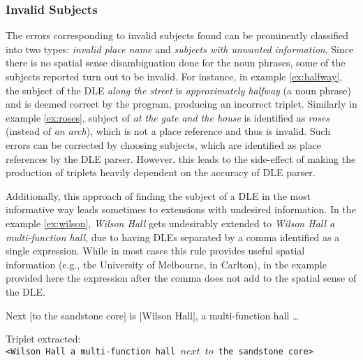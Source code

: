 \documentclass{acm_proc_article-sp}
\begin{document}
\subsubsection{Invalid Subjects}
The errors corresponding to invalid subjects found can be prominently classified into two types: \textit{invalid place name} and \textit{subjects with unwanted information}. Since there is no spatial sense disambiguation done for the noun phrases, some of the subjects reported turn out to be invalid. For instance, in example \ref{ex:halfway}, the subject of the DLE \textit{along the street} is \textit{approximately halfway} (a noun phrase) and is deemed correct by the program, producing an incorrect triplet. Similarly in example \ref{ex:roses}, subject of \textit{at the gate and the house} is identified as \textit{roses} (instead of \textit{an arch}), which is not a place reference and thus is invalid. Such errors can be corrected by choosing subjects, which are identified as place references by the DLE parser. However, this leads to the side-effect of making the production of triplets heavily dependent on the accuracy of DLE parser.

Additionally, this approach of finding the subject of a DLE in the most informative way leads sometimes to extensions with undesired information. In the example \ref{ex:wilson}, \textit{Wilson Hall} gets undesirably extended to \textit{Wilson Hall a multi-function hall}, due to having DLEs separated by a comma identified as a single expression. While in most cases this rule provides useful spatial information (e.g., the University of Melbourne, in Carlton), in the example provided here the expression after the comma does not add to the spatial sense of the DLE.
\begin{example}
\label{ex:wilson}
Next $[$to the sandstone core$]$ is $[$Wilson Hall$]$, a multi-function hall \dots
\end{example}
Triplet extracted:\\
\texttt{<Wilson Hall a multi-function hall $next$ $to$ the sandstone core>}
\end{document}
